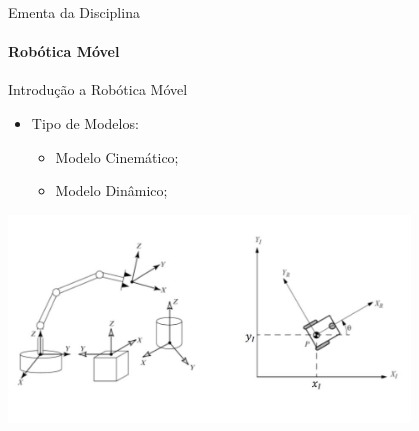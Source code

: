 \documentclass{beamer}
\begin{document}
\begin{frame}[c]{Ementa da Disciplina}
	\framesubtitle{Robótica Móvel}
	\begin{block}{Introdução a Robótica Móvel}
	\end{block}

	\begin{itemize}
		\item Tipo de Modelos:
		      \begin{itemize}
			      \item Modelo Cinemático;
			      \item Modelo Dinâmico;
		      \end{itemize}
	\end{itemize}
	\begin{center}
		\includegraphics[width=0.8\textwidth]{./images/mecanismos.jpg}
	\end{center}
\end{frame}
\end{document}
